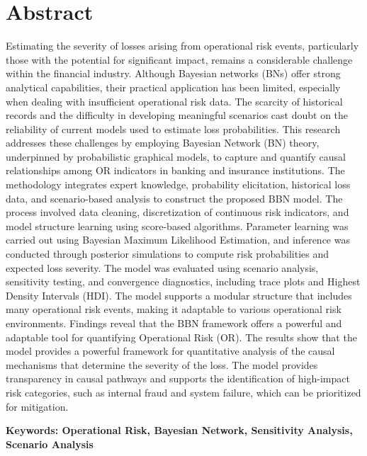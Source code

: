 \documentclass[12pt,a4paper]{extreport}
\begin{document}
\chapter*{Abstract}
Estimating the severity of losses arising from operational risk events, particularly those with the potential for significant impact, remains a considerable challenge within the financial industry. Although Bayesian networks (BNs) offer strong analytical capabilities, their practical application has been limited, especially when dealing with insufficient operational risk data. The scarcity of historical records and the difficulty in developing meaningful scenarios cast doubt on the reliability of current models used to estimate loss probabilities. This research addresses these challenges by employing Bayesian Network (BN) theory, underpinned by probabilistic graphical models, to capture and quantify causal relationships among OR indicators in banking and insurance institutions.
The methodology integrates expert knowledge, probability elicitation, historical loss data, and scenario-based analysis to construct the proposed BBN model. The process involved data cleaning, discretization of continuous risk indicators, and model structure learning using score-based algorithms. Parameter learning was carried out using Bayesian Maximum Likelihood Estimation, and inference was conducted through posterior simulations to compute risk probabilities and expected loss severity. The model was evaluated using scenario analysis, sensitivity testing, and convergence diagnostics, including trace plots and Highest Density Intervals (HDI). The model supports a modular structure that includes many operational risk events, making it adaptable to various operational risk environments.
Findings reveal that the BBN framework offers a powerful and adaptable tool for quantifying Operational Risk (OR). The results show that the model provides a powerful framework for quantitative analysis of the causal mechanisms that determine the severity of the loss. The model provides transparency in causal pathways and supports the identification of high-impact risk categories, such as internal fraud and system failure, which can be prioritized for mitigation.


\textbf{Keywords: Operational Risk, Bayesian Network, Sensitivity Analysis, Scenario Analysis}
\end{document}
